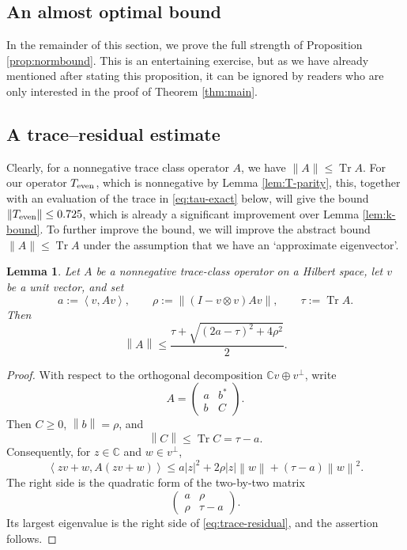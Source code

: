 \documentclass[11pt]{article}
\newtheorem{lemma}[theorem]{Lemma}
\theoremstyle{definition}
\theoremstyle{remark}
\newcommand{\ip}[2]{\left\langle #1,#2\right\rangle}
\newcommand{\norm}[1]{\left\lVert #1\right\rVert}
\newcommand{\abs}[1]{\left\lvert #1\right\rvert}
\newcommand{\Tr}{\operatorname{Tr}}
\begin{document}

\subsection{An almost optimal bound}

In the remainder of this section, we prove the full strength of Proposition \ref{prop:normbound}. This is an entertaining exercise, but as we have already mentioned after stating this proposition, it can be ignored by readers who are only interested in the proof of Theorem \ref{thm:main}.




\subsection*{A trace--residual estimate}

Clearly, for a nonnegative trace class operator $A$, we have $\|A\|\leq\Tr A$. For our operator $T_{\rm even}$, which is nonnegative by Lemma \ref{lem:T-parity}, this, together with an evaluation of the trace in \eqref{eq:tau-exact} below, will give the bound $\|T_{\rm even}\|\leq 0.725$, which is already a significant improvement over Lemma \ref{lem:k-bound}. To further improve the bound, we will improve the abstract bound $\|A\|\leq\Tr A$ under the assumption that we have an `approximate eigenvector'.

\begin{lemma}\label{lem:trace-residual}
Let $A$ be a nonnegative trace-class operator on a Hilbert space, let
$v$ be a unit vector, and set
\[
a:=\ip{v}{Av},
\qquad
\rho:=\norm{(I-v\otimes v)Av},
\qquad
\tau:=\operatorname{Tr}A.
\]
Then
\begin{equation}\label{eq:trace-residual}
\norm{A}\leq
\frac{\tau+\sqrt{(2a-\tau)^2+4\rho^2}}{2}.
\end{equation}
\end{lemma}

\begin{proof}
With respect to the orthogonal decomposition
$\mathbb C v\oplus v^\perp$, write
\[
A=\begin{pmatrix}a&b^*\\ b&C\end{pmatrix}.
\]
Then $C\geq0$, $\norm b=\rho$, and
\[
\norm C\leq\operatorname{Tr}C=\tau-a.
\]
Consequently, for $z\in\mathbb C$ and $w\in v^\perp$,
\[
\ip{zv+w}{A(zv+w)}
\leq a\abs z^2+2\rho\abs z\norm w+(\tau-a)\norm w^2.
\]
The right side is the quadratic form of the two-by-two matrix
\[
\begin{pmatrix}a&\rho\\ \rho&\tau-a\end{pmatrix}.
\]
Its largest eigenvalue is the right side of
\eqref{eq:trace-residual}, and the assertion follows.
\end{proof}
\end{document}
